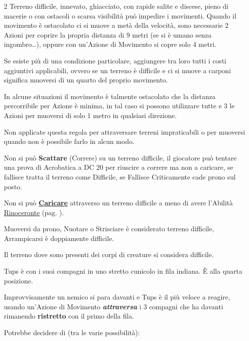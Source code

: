\begin{multicols}{2}
Terreno difficile, innevato, ghiacciato, con rapide salite e discese, pieno di macerie o con ostacoli o scarsa visibilità può impedire i movimenti. Quando il movimento è ostacolato ci si muove a metà della velocità, sono necessarie 2 Azioni per coprire la propria distanza di 9 metri (se si è umano senza ingombro…), oppure con un'Azione di Movimento si copre solo 4 metri.

Se esiste più di una condizione particolare, aggiungere tra loro tutti i costi aggiuntivi applicabili, ovvero se un terreno è difficile e ci si muove a carponi significa muoversi di un quarto del proprio movimento. 

In alcune situazioni il movimento è talmente ostacolato che la distanza percorribile per Azione è minima, in tal caso si possono utilizzare tutte e 3 le Azioni per muoversi di solo 1 metro in qualsiasi direzione.

Non applicate questa regola per attraversare terreni impraticabili o per muoversi quando non è possibile farlo in alcun modo.

Non si può \textbf{Scattare} (Correre) su un terreno difficile, il giocatore può tentare una prova di Acrobatica a DC 20 per riuscire a correre ma non a caricare, se fallisce tratta il terreno come Difficile, se Fallisce Criticamente cade prono sul posto. 

Non si può \hyperlink{carica}{\textbf{Caricare}} attraverso un terreno difficile a meno di avere l'Abilità \hyperlink{Rinoceronte}{Rinoceronte} (pag. \pageref{Rinoceronte}).

Muoversi da prono, Nuotare o Strisciare è considerato terreno difficile, Arrampicarsi è doppiamente difficile.

Il terreno dove sono presenti dei corpi di creature si considera difficile. 

\begin{giocatore} %
Tups è con i suoi compagni in uno stretto cunicolo in fila indiana. È alla quarta posizione.

Improvvisamente un nemico si para davanti e Tups è il più veloce a reagire, usando un'Azione di Movimento \emph{\textbf{attraversa}} i 3 compagni che ha davanti rimanendo \textbf{ristretto} con il primo della fila.

Potrebbe decidere di (tra le varie possibilità):


\end{giocatore}
\end{multicols}
